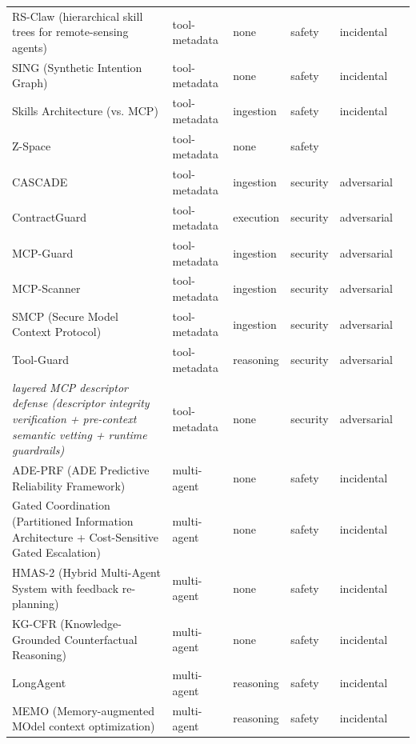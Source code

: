 \begin{longtable}{@{}p{}lllll@{}}
RS-Claw (hierarchical skill trees for remote-sensing agents) & tool-metadata & none & safety & incidental & \cite{liu-2026-rsclaw} \\
SING (Synthetic Intention Graph) & tool-metadata & none & safety & incidental & \cite{xiao-2026-sing} \\
Skills Architecture (vs. MCP) & tool-metadata & ingestion & safety & incidental & \cite{ayyagari-2026-context} \\
Z-Space & tool-metadata & none & safety &  & \cite{he-2025-zspace} \\
CASCADE & tool-metadata & ingestion & security & adversarial & \cite{turgut-2026-cascade} \\
ContractGuard & tool-metadata & execution & security & adversarial & \cite{iyer-2026-gate} \\
MCP-Guard & tool-metadata & ingestion & security & adversarial & \cite{xing-2025-mcpguard} \\
MCP-Scanner & tool-metadata & ingestion & security & adversarial & \cite{abadeh-2026-mcpscanner} \\
SMCP (Secure Model Context Protocol) & tool-metadata & ingestion & security & adversarial & \cite{hou-2026-smcp} \\
Tool-Guard & tool-metadata & reasoning & security & adversarial & \cite{shi-2026-think} \\
\emph{layered MCP descriptor defense (descriptor integrity verification + pre-context semantic vetting + runtime guardrails)} & tool-metadata & none & security & adversarial & \cite{jamshidi-2025-semantic} \\
ADE-PRF (ADE Predictive Reliability Framework) & multi-agent & none & safety & incidental & \cite{liu-2026-agent} \\
Gated Coordination (Partitioned Information Architecture + Cost-Sensitive Gated Escalation) & multi-agent & none & safety & incidental & \cite{jian-2026-gated} \\
HMAS-2 (Hybrid Multi-Agent System with feedback re-planning) & multi-agent & none & safety & incidental & \cite{chen-2023-scalable} \\
KG-CFR (Knowledge-Grounded Counterfactual Reasoning) & multi-agent & none & safety & incidental & \cite{maslowski-2026-decoupling} \\
LongAgent & multi-agent & reasoning & safety & incidental & \cite{zhao-2024-longagent} \\
MEMO (Memory-augmented MOdel context optimization) & multi-agent & reasoning & safety & incidental & \cite{xie-2026-memo} \\

\end{longtable}
